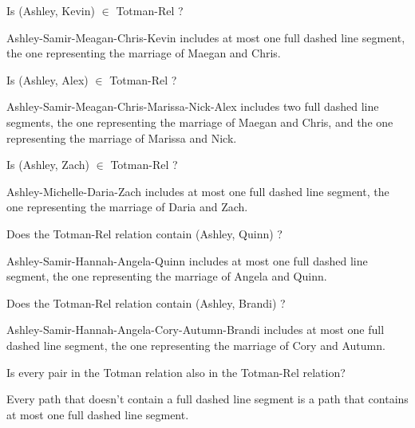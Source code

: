 \documentclass{ximera}
\begin{document}
\begin{exercise}
\begin{problem} Is (Ashley, Kevin) $\in$ Totman-Rel ?  
\begin{feedback}
Ashley-Samir-Meagan-Chris-Kevin includes at most one full dashed line segment, the one representing the marriage of Maegan and Chris.
\end{feedback}
\end{problem}

\begin{problem} Is (Ashley, Alex) $\in$ Totman-Rel ?  
\begin{feedback}
Ashley-Samir-Meagan-Chris-Marissa-Nick-Alex includes two full dashed line segments, the one representing the marriage of Maegan and Chris, and the one representing the marriage of Marissa and Nick.
\end{feedback}
\end{problem}

\begin{problem} Is (Ashley, Zach) $\in$ Totman-Rel ?  
\begin{feedback}
Ashley-Michelle-Daria-Zach includes at most one full dashed line segment, the one representing the marriage of Daria and Zach.
\end{feedback}
\end{problem}

\begin{problem} Does the Totman-Rel relation contain (Ashley, Quinn) ?  
\begin{feedback}
Ashley-Samir-Hannah-Angela-Quinn includes at most one full dashed line segment, the one representing the marriage of Angela and Quinn.
\end{feedback}
\end{problem}

\begin{problem} Does the Totman-Rel relation contain (Ashley, Brandi) ?  
\begin{feedback}
Ashley-Samir-Hannah-Angela-Cory-Autumn-Brandi includes at most one full dashed line segment, the one representing the marriage of Cory and Autumn.
\end{feedback}
\end{problem}

\begin{problem} Is every pair in the Totman relation also in the Totman-Rel relation?  
\begin{feedback}
Every path that doesn't contain a full dashed line segment is a path that contains at most one full dashed line segment.
\end{feedback}
\end{problem}


\end{exercise}
\end{document}
